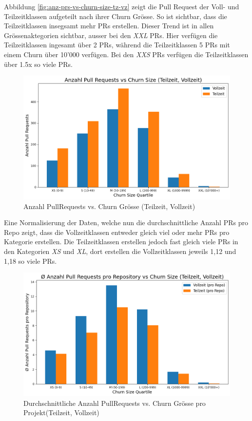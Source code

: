 Abbildung \autoref{fig:anz-prs-vs-churn-size-tz-vz} zeigt die Pull Request der Voll- und Teilzeitklassen aufgeteilt nach ihrer Churn Grösse. So ist sichtbar, dass die Teilzeitklassen insegsamt mehr PRs erstellen. Dieser Trend ist in allen Grössenaktegorien sichtbar, ausser bei den \textit{XXL} PRs. Hier verfügen die Teilzeitklassen ingesamt über 2 PRs, während die Teilzeitklassen 5 PRs mit einem Churn über 10'000 verfügen. Bei den \textit{XXS} PRs verfügen die Teilzeitklassen über 1.5x so viele PRs.

\begin{figure}[htbp]
    \includegraphics[width=\textwidth]{Figures/anz-prs-vs-churn-size-tz-vz.png}
    \caption{Anzahl PullRequests vs. Churn Grösse (Teilzeit, Vollzeit)}
    \label{fig:anz-prs-vs-churn-size-tz-vz}
\end{figure}

Eine Normalisierung der Daten, welche nun die durchschnittliche Anzahl PRs pro Repo zeigt, dass die Vollzeitklassen entweder gleich viel oder mehr PRs pro Kategorie erstellen. Die Teilzeitklassen erstellen jedoch fast gleich viele PRs in den Kategorien \textit{XS} und \textit{XL}, dort erstellen die Vollzeitklassen jeweils 1,12 und 1,18 so viele PRs. 

\begin{figure}[htbp]
    \includegraphics[width=\textwidth]{Figures/avg-anz-prs-vs-churn-size-tz-vz-pro-repo.png}
    \caption{Durchschnittliche Anzahl PullRequests vs. Churn Grösse pro Projekt(Teilzeit, Vollzeit)}
    \label{fig:anz-prs-vs-churn-size-tz-vz}
\end{figure}

